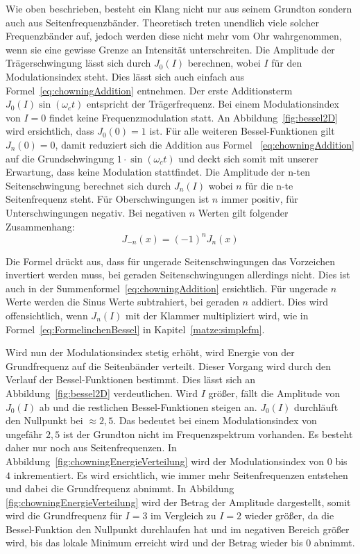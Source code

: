 Wie oben beschrieben, besteht ein Klang nicht nur aus seinem Grundton sondern auch aus Seitenfrequenzbänder. Theoretisch treten unendlich viele solcher Frequenzbänder auf, jedoch werden diese nicht mehr vom Ohr wahrgenommen, wenn sie eine gewisse Grenze an Intensität unterschreiten. \cite[S. 221]{lathi}
Die Amplitude der Trägerschwingung lässt sich durch $J_0(I)$ berechnen, wobei $I$ für den Modulationsindex steht. Dies lässt sich auch einfach aus Formel~\ref{eq:chowningAddition} entnehmen. Der erste Additionsterm $J_0(I)\sin(\omega_c t)$ entspricht der Trägerfrequenz. Bei einem Modulationsindex von $I=0$ findet keine Frequenzmodulation statt. An Abbildung~\ref{fig:bessel2D} wird ersichtlich, dass $J_0(0)=1$ ist. Für alle weiteren Bessel-Funktionen gilt $J_n(0)=0$, damit reduziert sich die Addition aus Formel~ \ref{eq:chowningAddition} auf die Grundschwingung $1\cdot\sin(\omega_c t)$ und deckt sich somit mit unserer Erwartung, dass keine Modulation stattfindet. Die Amplitude der n-ten Seitenschwingung berechnet sich durch $J_n(I)$ wobei $n$ für die n-te Seitenfrequenz steht. Für Oberschwingungen ist $n$ immer positiv, für Unterschwingungen negativ. Bei negativen $n$ Werten gilt folgender Zusammenhang: \cite[S. 223]{temme}
\begin{equation*}
J_{-n}(x)=(-1)^nJ_n(x)
\end{equation*}

Die Formel drückt aus, dass für ungerade Seitenschwingungen das Vorzeichen invertiert werden muss, bei geraden Seitenschwingungen allerdings nicht. Dies ist auch in der Summenformel~\ref{eq:chowningAddition} ersichtlich. Für ungerade $n$ Werte werden die Sinus Werte subtrahiert, bei geraden $n$ addiert. 
Dies wird offensichtlich, wenn $J_n(I)$ mit der Klammer multipliziert wird, wie in Formel~\ref{eq:FormelinchenBessel} in Kapitel~\ref{matze:simplefm}.

\label{bulli:besselModIndexZusammenahang}
Wird nun der Modulationsindex stetig erhöht, wird Energie von der Grundfrequenz auf die Seitenbänder verteilt. Dieser Vorgang wird durch den Verlauf der Bessel-Funktionen bestimmt. Dies lässt sich an Abbildung~\ref{fig:bessel2D} verdeutlichen. Wird $I$ größer, fällt die Amplitude von $J_0(I)$ ab und die restlichen Bessel-Funktionen steigen an. $J_0(I)$ durchläuft den Nullpunkt bei $\approx2,5$. Das bedeutet bei einem Modulationsindex von ungefähr $2,5$ ist der Grundton nicht im Frequenzspektrum vorhanden. Es besteht daher nur noch aus Seitenfrequenzen. In Abbildung~\ref{fig:chowningEnergieVerteilung} wird der Modulationsindex von $0$ bis $4$ inkrementiert.
Es wird ersichtlich, wie immer mehr Seitenfrequenzen entstehen und dabei die Grundfrequenz abnimmt. In Abbildung~ \ref{fig:chowningEnergieVerteilung} wird der Betrag der Amplitude dargestellt, somit wird die Grundfrequenz für $I=3$ im Vergleich zu $I=2$ wieder größer, da die Bessel-Funktion den Nullpunkt durchlaufen hat und im negativen Bereich größer wird, bis das lokale Minimum erreicht wird und der Betrag wieder bis $0$ abnimmt.

